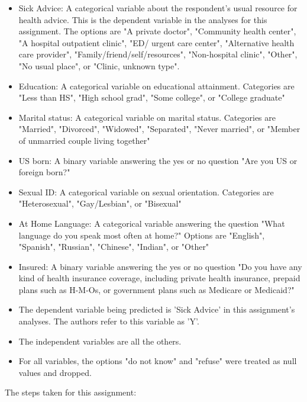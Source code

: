 \documentclass[10pt,twocolumn]{article}
\begin{document}
\begin{itemize}
\item Sick Advice: A categorical variable about the respondent's usual resource for
health advice. This is the dependent variable in the analyses for this
assignment. The options are
"A private doctor",
"Community health center",
"A hospital outpatient clinic",
"ED/ urgent care center",
"Alternative health care provider",
"Family/friend/self/resources",
"Non-hospital clinic",
"Other",
"No usual place", or
"Clinic, unknown type".
\item Education: A categorical variable on educational attainment. Categories are "Less than HS", "High school grad",
"Some college", or "College graduate"
\item Marital status: A categorical variable on marital status. Categories are
"Married",
"Divorced",
"Widowed",
"Separated",
"Never married", or
"Member of unmarried couple living together"
\item US born: A binary variable answering the yes or no question "Are you US or foreign born?"
\item Sexual ID: A categorical variable on sexual orientation. Categories are
"Heterosexual",
"Gay/Lesbian", or
"Bisexual"
\item At Home Language: A categorical variable answering the question "What language do you
speak most often at
home?" Options are
"English",
"Spanish",
"Russian",
"Chinese",
"Indian", or
"Other"
\item Insured: A binary variable answering the yes or no question "Do you have any
kind of health
insurance coverage,
including private
health insurance,
prepaid plans such as
H-M-Os, or
government plans
such as Medicare or
Medicaid?"
\item The dependent variable being predicted is 'Sick Advice' in this assignment's
analyses. The authors refer to this variable as 'Y'.
\item The independent variables are all the others.
\item  For all variables, the options "do not know" and "refuse"
were treated as null values and dropped.
\end{itemize}


The steps taken for this assignment:
\end{document}
